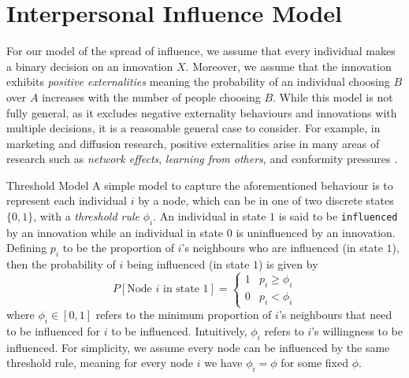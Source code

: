 \documentclass[10pt, oneside, reqno]{amsart}
\makeatletter
\theoremstyle{plain}%
\theoremstyle{definition}
\theoremstyle{remark}
\renewcommand\subsection{\@startsection{subsection}{2}%
  \z@{.5\linespacing\@plus.7\linespacing}{-.5em}%
  {\normalfont\scshape}}
\makeatother
\begin{document}




\section{Interpersonal Influence Model}

For our model of the spread of influence, we assume that every individual makes a binary decision
on an innovation $X$. Moreover, we assume that the innovation exhibits \textit{positive externalities}
meaning the probability of an individual choosing $B$ over $A$ increases with the number of 
people choosing $B$. While this model is not fully general, as it excludes negative externality 
behaviours and innovations with multiple decisions, it is a reasonable general case to consider. 
For example, in marketing and diffusion research, positive externalities arise in many areas of 
research such as \textit{network effects}, \textit{learning from others}, and conformity 
pressures \cite{Influential}.

\subsection{Threshold Model}
A simple model to capture the aforementioned behaviour is to represent each individual $i$ by a node,
which can be in one of two discrete states $\{ 0, 1\}$, with a \textit{threshold rule} $\phi_i$. 
An individual in state $1$ is said to be \texttt{influenced} by an innovation while an 
individual in state $0$ is uninfluenced by an innovation.
Defining $p_i$ to be the proportion of $i$'s neighbours who are influenced (in state $1$), then 
the probability of $i$ being influenced (in state $1$) is given by
\[ P[\text{Node } i \text{ in state } 1] = 
\begin{cases}
    1 & p_i \geq \phi_i \\
    0 & p_i < \phi_i
\end{cases} \]
where $\phi_i \in [0,1]$ refers to the minimum proportion of $i$'s neighbours that need to be 
influenced for $i$ to be influenced. Intuitively, $\phi_i$ refers to $i$'s willingness to be 
influenced.
For simplicity, we assume every node can be influenced by the same threshold rule, meaning 
for every node $i$ we have $\phi_i = \phi$ for some fixed $\phi$.
\end{document}
